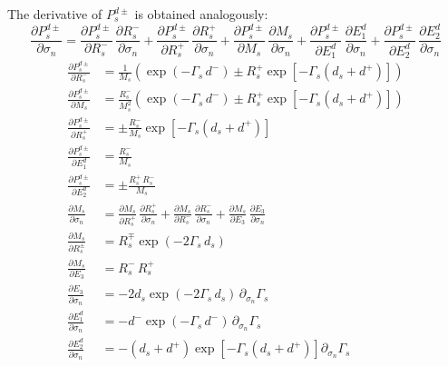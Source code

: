 \documentclass[12pt]{report}
\newcommand{\pds}[1]{\partial_{\sigma_{#1}}}   %
\begin{document}
The derivative of \(P_s^{d\pm}\) is obtained analogously:
\begin{equation}
    \frac{\partial P_s^{d\pm}}{\partial \sigma_n}
    = \frac{\partial P_s^{d\pm}}{\partial R_s^-}\,\frac{\partial R_s^-}{\partial \sigma_n}
    + \frac{\partial P_s^{d\pm}}{\partial R_s^+}\,\frac{\partial R_s^+}{\partial \sigma_n}
    + \frac{\partial P_s^{d\pm}}{\partial M_s}\,\frac{\partial M_s}{\partial \sigma_n}
    + \frac{\partial P_s^{d\pm}}{\partial E_1^d}\,\frac{\partial E_1^d}{\partial \sigma_n}
    + \frac{\partial P_s^{d\pm}}{\partial E_2^d}\,\frac{\partial E_2^d}{\partial \sigma_n}
    \label{eq:1.63}
\end{equation}
\begin{align}
    \frac{\partial P_s^{d\pm}}{\partial R_s^-}
    &= \frac{1}{M_s}
       \left(\exp(-\Gamma_s\,d^-) \pm R_s^+\exp\!\left[-\Gamma_s(d_s+d^+)\right]\right)
    \label{eq:1.64} \\
    \frac{\partial P_s^{d\pm}}{\partial M_s}
    &= \frac{R_s^-}{M_s^2}
       \left(\exp(-\Gamma_s\,d^-) \pm R_s^+\exp\!\left[-\Gamma_s(d_s+d^+)\right]\right)
    \label{eq:1.65} \\
    \frac{\partial P_s^{d\pm}}{\partial R_s^+}
    &= \pm\frac{R_s^-}{M_s}\exp\!\left[-\Gamma_s(d_s+d^+)\right]
    \label{eq:1.66} \\
    \frac{\partial P_s^{d\pm}}{\partial E_1^d}
    &= \frac{R_s^-}{M_s}
    \label{eq:1.67} \\
    \frac{\partial P_s^{d\pm}}{\partial E_2^d}
    &= \pm\frac{R_s^+\,R_s^-}{M_s}
    \label{eq:1.68} \\
    \frac{\partial M_s}{\partial \sigma_n}
    &= \frac{\partial M_s}{\partial R_s^+}\,\frac{\partial R_s^+}{\partial \sigma_n}
     + \frac{\partial M_s}{\partial R_s^-}\,\frac{\partial R_s^-}{\partial \sigma_n}
     + \frac{\partial M_s}{\partial E_3}\,\frac{\partial E_3}{\partial \sigma_n}
    \label{eq:1.69} \\
    \frac{\partial M_s}{\partial R_s^\pm}
    &= R_s^\mp\exp(-2\Gamma_s\,d_s)
    \label{eq:1.70} \\
    \frac{\partial M_s}{\partial E_3}
    &= R_s^-\,R_s^+
    \label{eq:1.71} \\
    \frac{\partial E_3}{\partial \sigma_n}
    &= -2d_s\exp(-2\Gamma_s\,d_s)\,\pds{n}\Gamma_s
    \label{eq:1.72} \\
    \frac{\partial E_1^d}{\partial \sigma_n}
    &= -d^-\exp(-\Gamma_s\,d^-)\,\pds{n}\Gamma_s
    \label{eq:1.73} \\
    \frac{\partial E_2^d}{\partial \sigma_n}
    &= -(d_s+d^+)\exp\!\left[-\Gamma_s(d_s+d^+)\right]\pds{n}\Gamma_s
    \label{eq:1.74}
\end{align}
\end{document}
